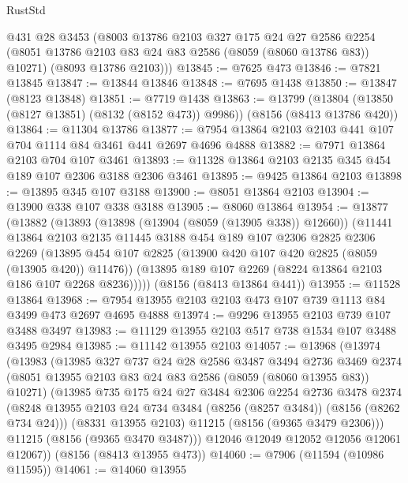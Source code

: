 \begin{lexlean}{RustStd}
\begin{coremodule}
{\begin{coremodule}
{{{{{{{{{{{{{{{{{{{{{{{{{{{{{{{{{{      @431
      @28
      @3453
      (@8003
        @13786
        @2103
        @327
        @175
        @24
        @27
        @2586
        @2254
        (@8051 @13786 @2103 @83 @24 @83 @2586 (@8059 (@8060 @13786 @83)) @10271)
        (@8093 @13786 @2103)))
@13845 := @7625 @473
@13846 := @7821 @13845
@13847 := @13844 @13846
@13848 := @7695 @1438
@13850 := @13847 (@8123 @13848)
@13851 := @7719 @1438
@13863 := @13799
    (@13804 (@13850 (@8127 @13851) (@8132 (@8152 @473)) @9986))
    (@8156 (@8413 @13786 @420))
@13864 := @11304 @13786
@13877 := @7954 @13864 @2103 @2103 @441 @107 @704 @1114 @84 @3461 @441 @2697 @4696 @4888
@13882 := @7971 @13864 @2103 @704 @107 @3461
@13893 := @11328 @13864 @2103 @2135 @345 @454 @189 @107 @2306 @3188 @2306 @3461
@13895 := @9425 @13864 @2103
@13898 := @13895 @345 @107 @3188
@13900 := @8051 @13864 @2103
@13904 := @13900 @338 @107 @338 @3188
@13905 := @8060 @13864
@13954 := @13877
    (@13882
      (@13893
        (@13898 (@13904 (@8059 (@13905 @338)) @12660))
        (@11441
          @13864
          @2103
          @2135
          @11445
          @3188
          @454
          @189
          @107
          @2306
          @2825
          @2306
          @2269
          (@13895 @454 @107 @2825 (@13900 @420 @107 @420 @2825 (@8059 (@13905 @420)) @11476))
          (@13895 @189 @107 @2269 (@8224 @13864 @2103 @186 @107 @2268 @8236)))))
    (@8156 (@8413 @13864 @441))
@13955 := @11528 @13864
@13968 := @7954 @13955 @2103 @2103 @473 @107 @739 @1113 @84 @3499 @473 @2697 @4695 @4888
@13974 := @9296 @13955 @2103 @739 @107 @3488 @3497
@13983 := @11129 @13955 @2103 @517 @738 @1534 @107 @3488 @3495 @2984
@13985 := @11142 @13955 @2103
@14057 := @13968
    (@13974
      (@13983
        (@13985
          @327
          @737
          @24
          @28
          @2586
          @3487
          @3494
          @2736
          @3469
          @2374
          (@8051 @13955 @2103 @83 @24 @83 @2586 (@8059 (@8060 @13955 @83)) @10271)
          (@13985
            @735
            @175
            @24
            @27
            @3484
            @2306
            @2254
            @2736
            @3478
            @2374
            (@8248 @13955 @2103 @24 @734 @3484 (@8256 (@8257 @3484)) (@8156 (@8262 @734 @24)))
            (@8331 @13955 @2103)
            @11215
            (@8156 (@9365 @3479 @2306)))
          @11215
          (@8156 (@9365 @3470 @3487)))
        @12046
        @12049
        @12052
        @12056
        @12061
        @12067))
    (@8156 (@8413 @13955 @473))
@14060 := @7906 (@11594 (@10986 @11595))
@14061 := @14060 @13955
}}}}}}}}}}}}}}}}}}}}}}}}}}}}}}}}}}
\end{coremodule}}
\end{coremodule}
\end{lexlean}
